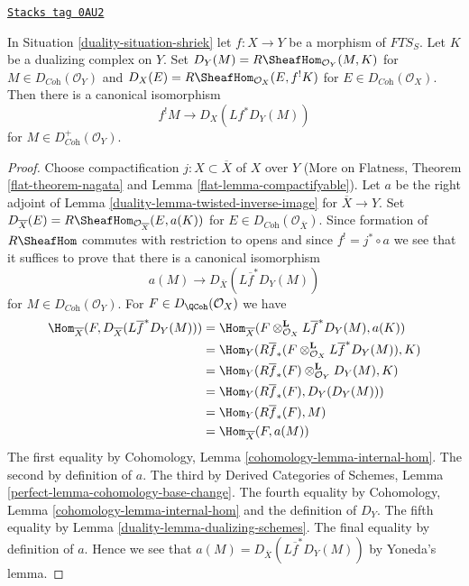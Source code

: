 \begin{lemma}
\label{duality-lemma-shriek-via-duality}
\href{https://stacks.math.columbia.edu/tag/0AU2}{\texttt{Stacks tag 0AU2}}

In Situation \ref{duality-situation-shriek} let $f : X \to Y$ be a morphism of
$\textit{FTS}_S$. Let $K$ be a dualizing complex
on $Y$. Set $D_Y(M) = R\SheafHom_{\mathcal{O}_Y}(M, K)$ for
$M \in D_{\textit{Coh}}(\mathcal{O}_Y)$ and
$D_X(E) = R\SheafHom_{\mathcal{O}_X}(E, f^!K)$ for
$E \in D_{\textit{Coh}}(\mathcal{O}_X)$. Then there is a canonical
isomorphism
$$
f^!M \longrightarrow D_X(Lf^*D_Y(M))
$$
for $M \in D_{\textit{Coh}}^+(\mathcal{O}_Y)$.
\end{lemma}

\begin{proof}

Choose compactification $j : X \subset \overline{X}$ of $X$ over $Y$
(More on Flatness, Theorem \ref{flat-theorem-nagata} and
Lemma \ref{flat-lemma-compactifyable}). Let $a$ be the
right adjoint of Lemma \ref{duality-lemma-twisted-inverse-image} for
$\overline{X} \to Y$. Set
$D_{\overline{X}}(E) = R\SheafHom_{\mathcal{O}_{\overline{X}}}(E, a(K))$
for $E \in D_{\textit{Coh}}(\mathcal{O}_{\overline{X}})$.
Since formation of $R\SheafHom$ commutes with restriction to opens
and since $f^! = j^* \circ a$ we see that it suffices to prove that
there is a canonical isomorphism
$$
a(M) \longrightarrow D_{\overline{X}}(L\overline{f}^*D_Y(M))
$$
for $M \in D_{\textit{Coh}}(\mathcal{O}_Y)$. For
$F \in D_\QCoh(\mathcal{O}_X)$ we have
\begin{align*}
\Hom_{\overline{X}}(
F, D_{\overline{X}}(L\overline{f}^*D_Y(M)))
& =
\Hom_{\overline{X}}(
F \otimes_{\mathcal{O}_X}^\mathbf{L} L\overline{f}^*D_Y(M), a(K)) \\
& =
\Hom_Y(
R\overline{f}_*(F \otimes_{\mathcal{O}_X}^\mathbf{L} L\overline{f}^*D_Y(M)),
K) \\
& =
\Hom_Y(
R\overline{f}_*(F) \otimes_{\mathcal{O}_Y}^\mathbf{L} D_Y(M),
K) \\
& =
\Hom_Y(
R\overline{f}_*(F), D_Y(D_Y(M))) \\
& =
\Hom_Y(R\overline{f}_*(F), M) \\
& = \Hom_{\overline{X}}(F, a(M))
\end{align*}
The first equality by Cohomology, Lemma \ref{cohomology-lemma-internal-hom}.
The second by definition of $a$.
The third by Derived Categories of Schemes, Lemma
\ref{perfect-lemma-cohomology-base-change}.
The fourth equality by Cohomology, Lemma \ref{cohomology-lemma-internal-hom}
and the definition of $D_Y$.
The fifth equality by Lemma \ref{duality-lemma-dualizing-schemes}.
The final equality by definition of $a$.
Hence we see that $a(M) = D_{\overline{X}}(L\overline{f}^*D_Y(M))$
by Yoneda's lemma.
\end{proof}

